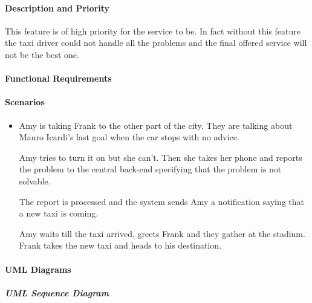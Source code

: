 \paragraph{Description and Priority}
This feature is of high priority for the service to be. In fact without this feature the taxi driver could not handle all the problems and the final offered service will not be the best one.
\paragraph{Functional Requirements}
\begin{itemize}
\end{itemize}
\paragraph{Scenarios}
\begin{itemize}
	\item Amy is taking Frank to the other part of the city. They are talking about Mauro Icardi's last goal when the car stops with no advice. \par Amy tries to turn it on but she can't. Then she takes her phone and reports the problem to the central back-end specifying that the problem is not solvable. \par The report is processed and the system sends Amy a notification saying that a new taxi is coming. \par Amy waits till the taxi arrived, greets Frank and they gather at the stadium. Frank takes the new taxi and heads to his destination.
\end{itemize}
\paragraph{UML Diagrams}
\subparagraph{UML Sequence Diagram}
